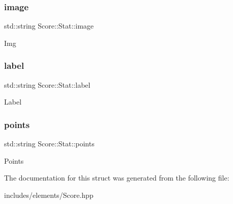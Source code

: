 \subsubsection{\texorpdfstring{image}{image}}
{\footnotesize\ttfamily std\+::string Score\+::\+Stat\+::image}

Img \mbox{\label{struct_score_1_1_stat_a0ffe53744dc7681868907a1ba686f9a2}} 
\subsubsection{\texorpdfstring{label}{label}}
{\footnotesize\ttfamily std\+::string Score\+::\+Stat\+::label}

Label \mbox{\label{struct_score_1_1_stat_a5772fc05f54c1d2848f115db69a04720}} 
\subsubsection{\texorpdfstring{points}{points}}
{\footnotesize\ttfamily std\+::string Score\+::\+Stat\+::points}

Points 

The documentation for this struct was generated from the following file\+:\begin{DoxyCompactItemize}
\item 
includes/elements/Score.\+hpp\end{DoxyCompactItemize}
